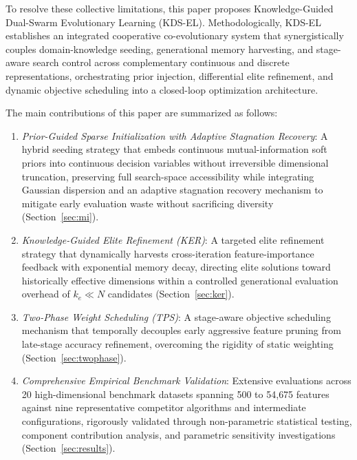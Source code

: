 \documentclass[final,5p,times,fleqn]{elsarticle}
\begin{document}
To resolve these collective limitations, this paper proposes Knowledge-Guided Dual-Swarm Evolutionary Learning (KDS-EL). Methodologically, KDS-EL establishes an integrated cooperative co-evolutionary system that synergistically couples domain-knowledge seeding, generational memory harvesting, and stage-aware search control across complementary continuous and discrete representations, orchestrating prior injection, differential elite refinement, and dynamic objective scheduling into a closed-loop optimization architecture.

The main contributions of this paper are summarized as follows:
\begin{enumerate}
\item \textit{Prior-Guided Sparse Initialization with Adaptive Stagnation Recovery}: A hybrid seeding strategy that embeds continuous mutual-information soft priors into continuous decision variables without irreversible dimensional truncation, preserving full search-space accessibility while integrating Gaussian dispersion and an adaptive stagnation recovery mechanism to mitigate early evaluation waste without sacrificing diversity (Section~\ref{sec:mi}).
\item \textit{Knowledge-Guided Elite Refinement (KER)}: A targeted elite refinement strategy that dynamically harvests cross-iteration feature-importance feedback with exponential memory decay, directing elite solutions toward historically effective dimensions within a controlled generational evaluation overhead of $k_e \ll N$ candidates (Section~\ref{sec:ker}).
\item \textit{Two-Phase Weight Scheduling (TPS)}: A stage-aware objective scheduling mechanism that temporally decouples early aggressive feature pruning from late-stage accuracy refinement, overcoming the rigidity of static weighting (Section~\ref{sec:twophase}).
\item \textit{Comprehensive Empirical Benchmark Validation}: Extensive evaluations across 20 high-dimensional benchmark datasets spanning 500 to 54{,}675 features against nine representative competitor algorithms and intermediate configurations, rigorously validated through non-parametric statistical testing, component contribution analysis, and parametric sensitivity investigations (Section~\ref{sec:results}).
\end{enumerate}
\end{document}
